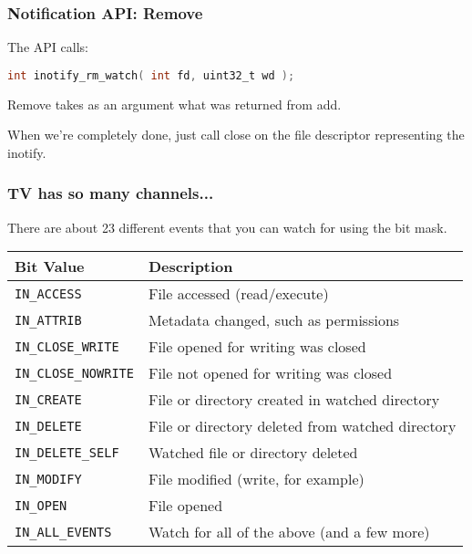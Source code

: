 \begin{frame}[fragile]
	\frametitle{Notification API: Remove}

	The API calls:
	\begin{lstlisting}[language=C]
int inotify_rm_watch( int fd, uint32_t wd );
\end{lstlisting}

	Remove takes as an argument what was returned from add.

	When we're completely done, just call close on the file descriptor representing the inotify.

\end{frame}


\begin{frame}
	\frametitle{TV has so many channels...}

	There are about 23 different events that you can watch for using the bit mask.

	\begin{center}
		\begin{tabular}{l|l}
			\textbf{Bit Value}          & \textbf{Description}                             \\ \hline
			\texttt{IN\_ACCESS}         & File accessed (read/execute)                     \\
			\texttt{IN\_ATTRIB}         & Metadata changed, such as permissions            \\
			\texttt{IN\_CLOSE\_WRITE}   & File opened for writing was closed               \\
			\texttt{IN\_CLOSE\_NOWRITE} & File not opened for writing was closed           \\
			\texttt{IN\_CREATE}         & File or directory created in watched directory   \\
			\texttt{IN\_DELETE}         & File or directory deleted from watched directory \\
			\texttt{IN\_DELETE\_SELF}   & Watched file or directory deleted                \\
			\texttt{IN\_MODIFY}         & File modified (write, for example)               \\
			\texttt{IN\_OPEN}           & File opened                                      \\
			\texttt{IN\_ALL\_EVENTS}    & Watch for all of the above (and a few more)
		\end{tabular}
	\end{center}

\end{frame}


